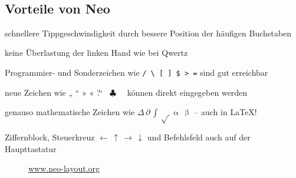 \documentclass[%
  a4paper
  ,ngerman
  ,notumble,12pt,
]{leaflet}
\def\hksqrt{\mathpalette\DHLhksqrt}
\def\DHLhksqrt#1#2{\setbox0=\hbox{$#1\sqrt{#2\,}$}\dimen0=\ht0
\advance\dimen0-0.2\ht0
\setbox2=\hbox{\vrule height\ht0 depth -\dimen0}%
{\box0\lower0.4pt\box2}}
\begin{document}
\ \newline

\subsection{Vorteile von Neo}
\begin{compactitem}
\item schnellere Tippgeschwindigkeit durch bessere Position der häufigen Buchstaben
\item keine Überlastung der linken Hand wie bei Qwertz
\item Programmier- und Sonderzeichen wie \texttt{/ \textbackslash\ [ ] \$ >~=} sind gut erreichbar
\item neue Zeichen wie „ “ » « ?‘ \cent\ $\clubsuit$ \female\ \textellipsis\ können direkt eingegeben werden
\item genauso mathematische Zeichen wie $\Delta\,\partial\,\int\,\surd\,\upalpha\,\upbeta$ -- auch in \LaTeX! %
\item Ziffernblock, Steuerkreuz $\leftarrow\,\uparrow\,\rightarrow\,\downarrow$
und Befehlsfeld auch auf der Haupttastatur
\end{compactitem}

\begin{figure}[b]
\begin{center}
\url{www.neo-layout.org}
\end{center}
\end{figure}
\end{document}
